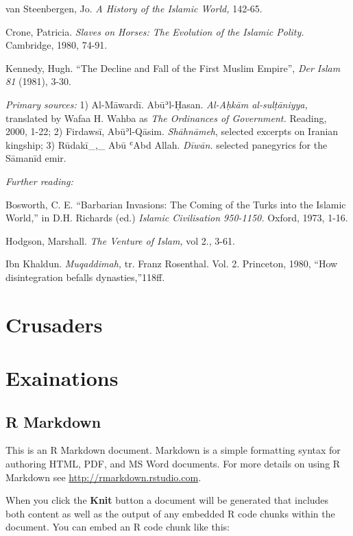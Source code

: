 \documentclass[
]{book}
\begin{document}
van Steenbergen, Jo. \emph{A History of the Islamic World,} 142-65.

Crone, Patricia. \emph{Slaves on Horses: The Evolution of the Islamic Polity.} Cambridge, 1980, 74-91.

Kennedy, Hugh. ``The Decline and Fall of the First Muslim Empire'', \emph{Der Islam 81} (1981), 3-30.

\emph{Primary sources:} 1) Al-Māwardī. Abūʾl-Ḥasan. \emph{Al-Aḥkām al-sulṭāniyya,} translated by Wafaa H. Wahba as \emph{The Ordinances of Government.} Reading, 2000, 1-22; 2) Firdawsī, Abūʾl-Qāsim. \emph{Shāhnāmeh},
selected excerpts on Iranian kingship; 3) Rūdakī\_,\_ Abū ʿAbd Allah.
\emph{Dīwān.} selected panegyrics for the Sāmanīd emir.

\emph{Further reading:}

Bosworth, C. E. ``Barbarian Invasions: The Coming of the Turks into the
Islamic World,'' in D.H. Richards (ed.) \emph{Islamic Civilisation 950-1150.}
Oxford, 1973, 1-16.

Hodgson, Marshall. \emph{The Venture of Islam,} vol 2., 3-61.

Ibn Khaldun. \emph{Muqaddimah,} tr. Franz Rosenthal. Vol. 2. Princeton, 1980,
``How disintegration befalls dynasties,''118ff.

\hypertarget{crusaders}{%
\chapter{Crusaders}\label{crusaders}}

\hypertarget{exainations}{%
\chapter{Exainations}\label{exainations}}

\hypertarget{r-markdown}{%
\section{R Markdown}\label{r-markdown}}

This is an R Markdown document. Markdown is a simple formatting syntax for authoring HTML, PDF, and MS Word documents. For more details on using R Markdown see \url{http://rmarkdown.rstudio.com}.

When you click the \textbf{Knit} button a document will be generated that includes both content as well as the output of any embedded R code chunks within the document. You can embed an R code chunk like this:
\end{document}

